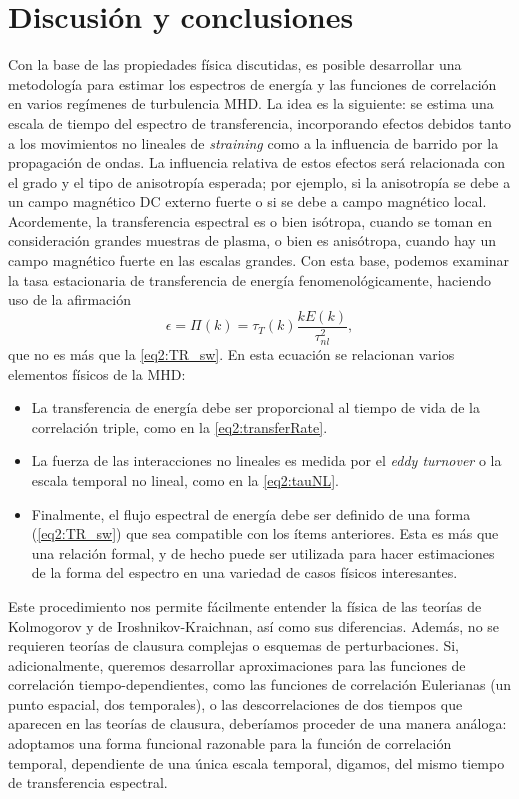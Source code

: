 \section{Discusión y conclusiones}\label{sec:FundConclusiones}

Con la base de las propiedades física discutidas, es posible
desarrollar una metodología para estimar los espectros de energía y
las funciones de correlación en varios regímenes de turbulencia
MHD. La idea es la siguiente: se estima una escala de tiempo del
espectro de transferencia, incorporando efectos debidos tanto a los
movimientos no lineales de \textit{straining} como a la influencia
de barrido por la propagación de ondas. La influencia
relativa de estos efectos será relacionada con el grado y el tipo de
anisotropía esperada; por ejemplo, si la anisotropía se debe a un
campo magnético DC externo fuerte o si se debe a campo magnético
local. Acordemente, la transferencia espectral es o bien isótropa,
cuando se toman en consideración grandes muestras de plasma, o bien es
anisótropa, cuando hay un campo magnético fuerte en las escalas
grandes. Con esta base, podemos examinar la tasa estacionaria de
transferencia de energía fenomenológicamente, haciendo uso de la
afirmación
\begin{equation}
  \epsilon = \Pi(k) = \tau_T(k) \frac{kE(k)}{\tau_{nl}^2},
\end{equation}
que no es más que la \cref{eq2:TR_sw}. En esta ecuación se
relacionan varios elementos físicos de la MHD:
\begin{itemize}
\item La transferencia de energía debe ser proporcional al tiempo de
  vida de la correlación triple, como en la \cref{eq2:transferRate}.
\item La fuerza de las interacciones no lineales es medida por el
  \textit{eddy turnover} o la escala temporal no lineal, como en
  la \cref{eq2:tauNL}.
\item Finalmente, el flujo espectral de energía debe ser definido de
  una forma (\cref{eq2:TR_sw}) que sea compatible con los ítems
  anteriores. Esta es más que una relación formal, y de hecho puede
  ser utilizada para hacer estimaciones de la forma del espectro en
  una variedad de casos físicos interesantes.
\end{itemize}

Este procedimiento nos permite fácilmente entender la física de las
teorías de Kolmogorov y de Iroshnikov-Kraichnan, así como sus
diferencias. Además, no se requieren teorías de clausura complejas o
esquemas de perturbaciones. Si, adicionalmente, queremos desarrollar
aproximaciones para las funciones de correlación tiempo-dependientes,
como las funciones de correlación Eulerianas (un punto espacial, dos
temporales), o las descorrelaciones de dos tiempos que aparecen en las
teorías de clausura, deberíamos proceder de una manera análoga:
adoptamos una forma funcional razonable para la función de correlación
temporal, dependiente de una única escala temporal, digamos,
del mismo tiempo de transferencia espectral.

